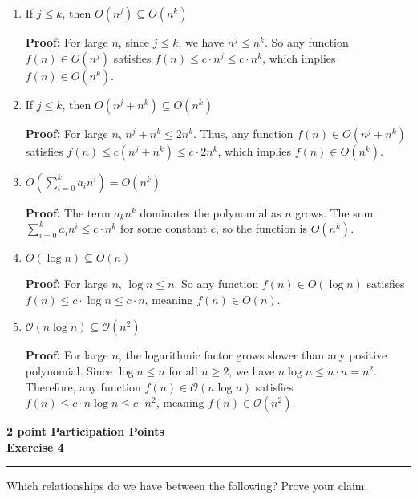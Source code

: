\documentclass{article}
\theoremstyle{theorem}
\theoremstyle{definition}
\theoremstyle{remark}
\begin{document}
\begin{enumerate}
    \item If \( j \leq k \), then \( O(n^j) \subseteq O(n^k) \)

    \textbf{Proof:} For large \( n \), since \( j \leq k \), we have \( n^j \leq n^k \). So any function \( f(n) \in O(n^j) \) satisfies \( f(n) \leq c \cdot n^j \leq c \cdot n^k \), which implies \( f(n) \in O(n^k) \).

    \item If \( j \leq k \), then \( O(n^j + n^k) \subseteq O(n^k) \)

    \textbf{Proof:} For large \( n \), \( n^j + n^k \leq 2n^k \). Thus, any function \( f(n) \in O(n^j + n^k) \) satisfies \( f(n) \leq c(n^j + n^k) \leq c \cdot 2n^k \), which implies \( f(n) \in O(n^k) \).

    \item \( O\left( \sum_{i=0}^{k} a_i n^i \right) = O(n^k) \)

    \textbf{Proof:} The term \( a_k n^k \) dominates the polynomial as \( n \) grows. The sum \( \sum_{i=0}^{k} a_i n^i \leq c \cdot n^k \) for some constant \( c \), so the function is \( O(n^k) \).

    \item \( O(\log n) \subseteq O(n) \)

    \textbf{Proof:} For large \( n \), \( \log n \leq n \). So any function \( f(n) \in O(\log n) \) satisfies \( f(n) \leq c \cdot \log n \leq c \cdot n \), meaning \( f(n) \in O(n) \).

    \item \( \mathcal{O}(n \log n) \subseteq \mathcal{O}(n^2) \)

    \textbf{Proof:} For large \( n \), the logarithmic factor grows slower than any positive polynomial. Since \( \log n \leq n \) for all \( n \geq 2 \), we have \( n \log n \leq n \cdot n = n^2 \). Therefore, any function \( f(n) \in \mathcal{O}(n \log n) \) satisfies \( f(n) \leq c \cdot n \log n \leq c \cdot n^2 \), meaning \( f(n) \in \mathcal{O}(n^2) \).

\end{enumerate}

\textbf {2 point Participation Points}\\
\textbf{Exercise 4}
\vspace{0.5em}
\hrule
\vspace{0.5em}
Which relationships do we have between the following? Prove your claim.
\end{document}
